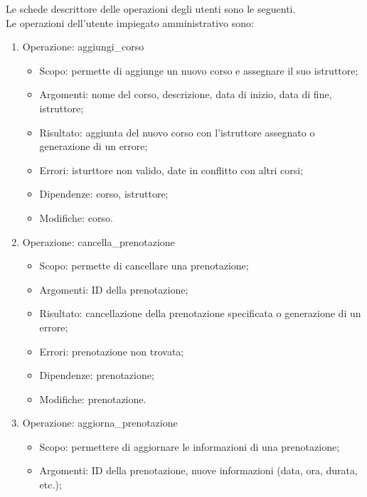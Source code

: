 \documentclass{article}
\begin{document}
    \newpage
    \begin{flushleft}
        Le schede descrittore delle operazioni degli utenti sono le seguenti. \\
        Le operazioni dell'utente impiegato amministrativo sono:
        \begin{enumerate}
            \item Operazione: aggiungi\_corso \\
            \begin{itemize}
                \item Scopo: permette di aggiunge un nuovo corso e assegnare il suo istruttore;
                \item Argomenti: nome del corso, descrizione, data di inizio, data di fine, istruttore;
                \item Risultato: aggiunta del nuovo corso con l'istruttore assegnato o generazione di un errore;
                \item Errori: isturttore non valido, date in conflitto con altri corsi;
                \item Dipendenze: corso, istruttore;
                \item Modifiche: corso.
            \end{itemize}
            \item Operazione: cancella\_prenotazione \\
            \begin{itemize}
                \item Scopo: permette di cancellare una prenotazione;
                \item Argomenti: ID della prenotazione;
                \item Risultato: cancellazione della prenotazione specificata o generazione di un errore;
                \item Errori: prenotazione non trovata;
                \item Dipendenze: prenotazione;
                \item Modifiche: prenotazione.
            \end{itemize}
            \item Operazione: aggiorna\_prenotazione \\
            \begin{itemize}
                \item Scopo: permettere di aggiornare le informazioni di una prenotazione;
                \item Argomenti: ID della prenotazione, nuove informazioni (data, ora, durata, etc.);

\end{itemize}
\end{enumerate}
\end{flushleft}
\end{document}
